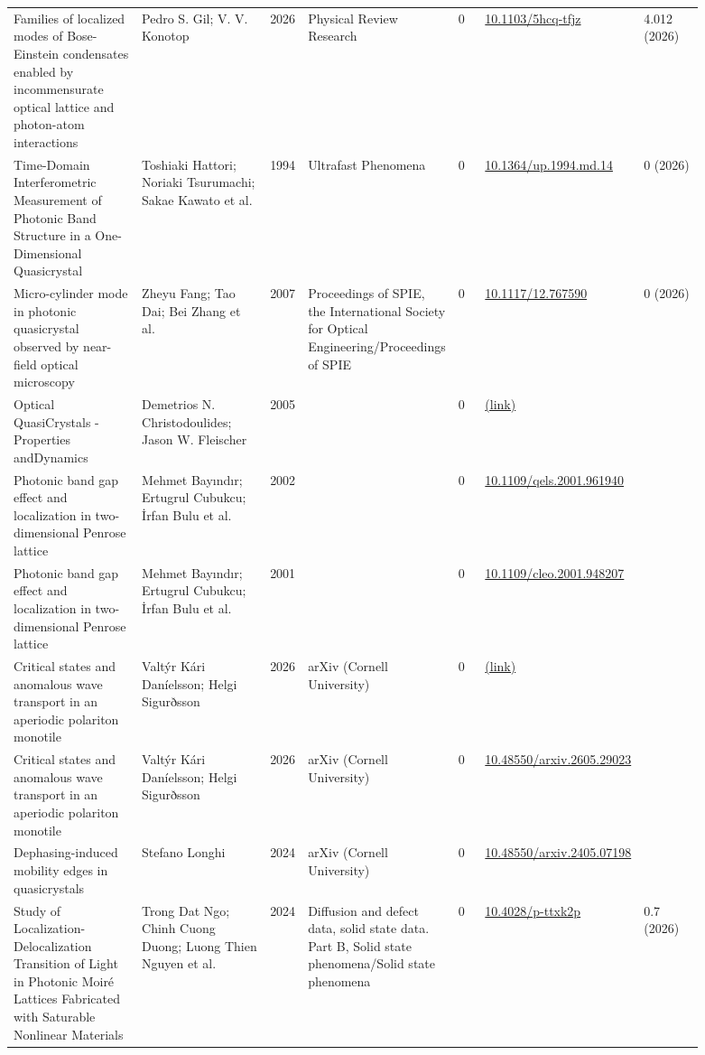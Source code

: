 \documentclass[10pt,a4paper]{article}
\begin{document}
{\begin{longtable}{p{0.192\linewidth}p{0.192\linewidth}p{0.043\linewidth}p{0.192\linewidth}p{0.043\linewidth}p{0.132\linewidth}p{0.096\linewidth}}
Families of localized modes of Bose-Einstein condensates enabled by incommensurate optical lattice and photon-atom interactions & Pedro S. Gil; V. V. Konotop & 2026 & Physical Review Research & 0 & \href{https://doi.org/10.1103/5hcq-tfjz}{10.1103/5hcq-tfjz} & 4.012 (2026) \\
Time-Domain Interferometric Measurement of Photonic Band Structure in a One-Dimensional Quasicrystal & Toshiaki Hattori; Noriaki Tsurumachi; Sakae Kawato et al. & 1994 & Ultrafast Phenomena & 0 & \href{https://doi.org/10.1364/up.1994.md.14}{10.1364/up.1994.md.14} & 0 (2026) \\
Micro-cylinder mode in photonic quasicrystal observed by near-field optical microscopy & Zheyu Fang; Tao Dai; Bei Zhang et al. & 2007 & Proceedings of SPIE, the International Society for Optical Engineering/Proceedings of SPIE & 0 & \href{https://doi.org/10.1117/12.767590}{10.1117/12.767590} & 0 (2026) \\
Optical QuasiCrystals -Properties andDynamics & Demetrios N. Christodoulides; Jason W. Fleischer & 2005 &  & 0 & \href{https://openalex.org/W2187545214}{(link)} &  \\
Photonic band gap effect and localization in two-dimensional Penrose lattice & Mehmet Bayındır; Ertugrul Cubukcu; İrfan Bulu et al. & 2002 &  & 0 & \href{https://doi.org/10.1109/qels.2001.961940}{10.1109/qels.2001.961940} &  \\
Photonic band gap effect and localization in two-dimensional Penrose lattice & Mehmet Bayındır; Ertugrul Cubukcu; İrfan Bulu et al. & 2001 &  & 0 & \href{https://doi.org/10.1109/cleo.2001.948207}{10.1109/cleo.2001.948207} &  \\
Critical states and anomalous wave transport in an aperiodic polariton monotile & Valtýr Kári Daníelsson; Helgi Sigurðsson & 2026 & arXiv (Cornell University) & 0 & \href{https://openalex.org/W7162894222}{(link)} &  \\
Critical states and anomalous wave transport in an aperiodic polariton monotile & Valtýr Kári Daníelsson; Helgi Sigurðsson & 2026 & arXiv (Cornell University) & 0 & \href{https://doi.org/10.48550/arxiv.2605.29023}{10.48550/arxiv.2605.29023} &  \\
Dephasing-induced mobility edges in quasicrystals & Stefano Longhi & 2024 & arXiv (Cornell University) & 0 & \href{https://doi.org/10.48550/arxiv.2405.07198}{10.48550/arxiv.2405.07198} &  \\
Study of Localization-Delocalization Transition of Light in Photonic Moiré Lattices Fabricated with Saturable Nonlinear Materials & Trong Dat Ngo; Chinh Cuong Duong; Luong Thien Nguyen et al. & 2024 & Diffusion and defect data, solid state data. Part B, Solid state phenomena/Solid state phenomena & 0 & \href{https://doi.org/10.4028/p-ttxk2p}{10.4028/p-ttxk2p} & 0.7 (2026) \\

\end{longtable}}
\end{document}
